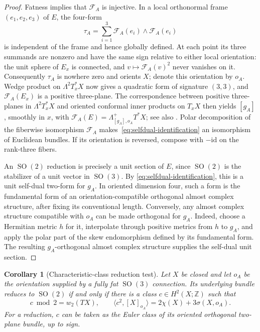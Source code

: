 \documentclass[11pt]{amsart}
\newcommand{\SO}{\operatorname{SO}}
\newcommand{\Z}{\mathbb Z}
\theoremstyle{plain}
\newtheorem{corollary}[theorem]{Corollary}
\theoremstyle{definition}
\theoremstyle{remark}
\begin{document}
\begin{proof}
Fatness implies that $\mathscr F_A$ is injective.  In a local
orthonormal frame $(e_1,e_2,e_3)$ of $E$, the four-form
\[
 \tau_A=\sum_{i=1}^3
 \mathscr F_A(e_i)\wedge\mathscr F_A(e_i)
\]
is independent of the frame and hence globally defined.  At each
point its three summands are nonzero and have the same sign relative
to either local orientation: the unit sphere of $E_x$ is connected,
and $v\mapsto\mathscr F_A(v)^2$ never vanishes on it.
Consequently $\tau_A$ is nowhere zero and orients $X$; denote this
orientation by $o_A$.  Wedge product on $\Lambda^2T_x^*X$ now gives a
quadratic form of signature $(3,3)$, and
$\mathscr F_A(E_x)$ is a positive three-plane.  The correspondence
between positive three-planes
in $\Lambda^2T_x^*X$ and oriented conformal inner products on $T_xX$
then yields $[g_A]$, smoothly in $x$, with
$\mathscr F_A(E)=\Lambda^+_{[g_A],o_A}T^*X$; see also
\cite[Section~2.2]{FP}.  Polar decomposition of the fiberwise
isomorphism $\mathscr F_A$ makes~\eqref{eq:selfdual-identification}
an isomorphism of Euclidean bundles.  If its orientation is reversed,
compose with $-\mathrm{id}$ on the rank-three fibers.

An $\SO(2)$ reduction is precisely a unit section of $E$, since
$\SO(2)$ is the stabilizer of a unit vector in $\SO(3)$.  By
\eqref{eq:selfdual-identification}, this is a unit self-dual two-form
for $g_A$.  In oriented dimension four, such a form is the fundamental
form of an orientation-compatible orthogonal almost complex structure,
after fixing its conventional length.  Conversely, any almost complex
structure compatible with $o_A$ can be made orthogonal for $g_A$.
Indeed, choose a Hermitian metric $h$ for it, interpolate through positive
metrics from $h$ to $g_A$, and apply the polar part of the skew
endomorphism defined by its fundamental form.  The resulting
$g_A$-orthogonal almost complex structure supplies the self-dual
unit section.
\end{proof}

\begin{corollary}[Characteristic-class reduction test]
Let $X$ be closed and let $o_A$ be the orientation supplied by a fully
fat $\SO(3)$ connection.  Its underlying bundle reduces to $\SO(2)$
if and only if there is a class $c\in H^2(X;\Z)$ such that
\[
 c\bmod 2=w_2(TX),\qquad
 \langle c^2,[X]_{o_A}\rangle=2\chi(X)+3\sigma(X,o_A).
\]
For a reduction, $c$ can be taken as the Euler class of its oriented
orthogonal two-plane bundle, up to sign.
\end{corollary}
\end{document}
